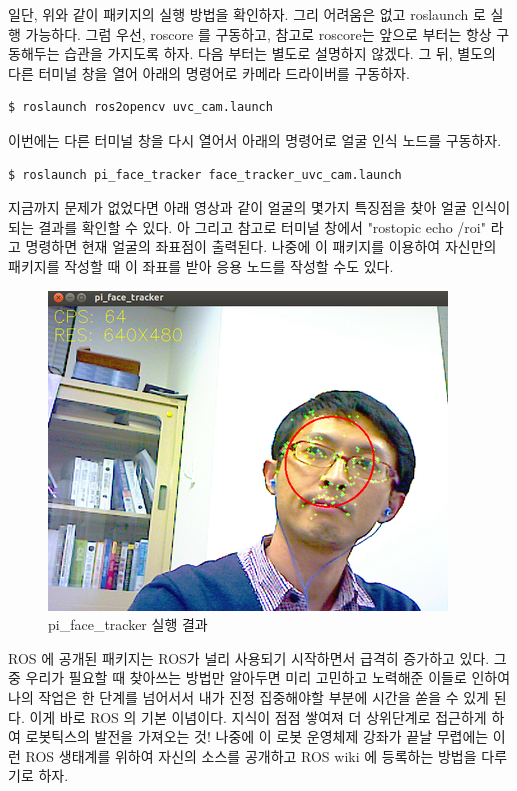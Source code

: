 일단, 위와 같이 패키지의 실행 방법을 확인하자. 그리 어려움은 없고 roslaunch 로 실행 가능하다. 그럼 우선, roscore 를 구동하고, 참고로 roscore는 앞으로 부터는 항상 구동해두는 습관을 가지도록 하자. 다음 부터는 별도로 설명하지 않겠다. 그 뒤, 별도의 다른 터미널 창을 열어 아래의 명령어로 카메라 드라이버를 구동하자.

\begin{lstlisting}[language=ROS]
$ roslaunch ros2opencv uvc_cam.launch
\end{lstlisting}

이번에는 다른 터미널 창을 다시 열어서 아래의 명령어로 얼굴 인식 노드를 구동하자.

\begin{lstlisting}[language=ROS]
$ roslaunch pi_face_tracker face_tracker_uvc_cam.launch
\end{lstlisting}

지금까지 문제가 없었다면 아래 영상과 같이 얼굴의 몇가지 특징점을 찾아 얼굴 인식이 되는 결과를 확인할 수 있다. 아 그리고 참고로 터미널 창에서 "rostopic echo /roi" 라고 명령하면 현재 얼굴의 좌표점이 출력된다. 나중에 이 패키지를 이용하여 자신만의 패키지를 작성할 때 이 좌표를 받아 응용 노드를 작성할 수도 있다.

\begin{figure}[h]
\centering\includegraphics[width=0.5\columnwidth]{pictures/chapter8/openpkg6.png}
\caption{pi\_face\_tracker 실행 결과}
\end{figure}

ROS 에 공개된 패키지는 ROS가 널리 사용되기 시작하면서 급격히 증가하고 있다. 그 중 우리가 필요할 때 찾아쓰는 방법만 알아두면 미리 고민하고 노력해준 이들로 인하여 나의 작업은 한 단계를 넘어서서 내가 진정 집중해야할 부분에 시간을 쏟을 수 있게 된다. 이게 바로 ROS 의 기본 이념이다. 지식이 점점 쌓여져 더 상위단계로 접근하게 하여 로봇틱스의 발전을 가져오는 것! 나중에 이 로봇 운영체제 강좌가 끝날 무렵에는 이런 ROS 생태계를 위하여 자신의 소스를 공개하고 ROS wiki 에 등록하는 방법을 다루기로 하자.







